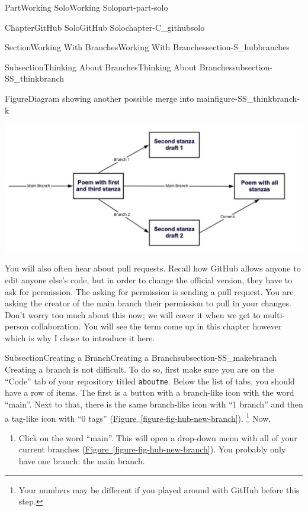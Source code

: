 \documentclass[oneside,10pt,]{book}
\newcommand{\xreffont}{\relax}
\newcommand{\mono}[1]{\texttt{#1}}
\begin{document}
\begin{partptx}{Part}{Working Solo}{}{Working Solo}{}{}{part-part-solo}
\begin{chapterptx}{Chapter}{GitHub Solo}{}{GitHub Solo}{}{}{chapter-C_githubsolo}
\begin{sectionptx}{Section}{Working With Branches}{}{Working With Branches}{}{}{section-S_hubbranches}
\begin{subsectionptx}{Subsection}{Thinking About Branches}{}{Thinking About Branches}{}{}{subsection-SS_thinkbranch}
\begin{figureptx}{Figure}{Diagram showing another possible merge into main}{figure-SS_thinkbranch-k}{}
\begin{image}{0.05}{0.9}{0.05}{}
\includegraphics[width=\linewidth]{external/merge_poem2.pdf}
\end{image}%
\tcblower
\end{figureptx}%
You will also often hear about pull requests. Recall how GitHub allows anyone to edit anyone else's code, but in order to change the official version, they have to ask for permission. The asking for permission is sending a pull request. You are asking the creator of the main branch their permission to pull in your changes. Don't worry too much about this now; we will cover it when we get to multi-person collaboration. You will see the term come up in this chapter however which is why I chose to introduce it here.%
\end{subsectionptx}
%
%
\typeout{************************************************}
\typeout{************************************************}
%
\begin{subsectionptx}{Subsection}{Creating a Branch}{}{Creating a Branch}{}{}{subsection-SS_makebranch}
%
%
Creating a branch is not difficult. To do so, first make sure you are on the ``Code'' tab of your repository titled \mono{aboutme}. Below the list of tabs, you should have a row of items. The first is a button with a branch-like icon with the word ``main''. Next to that, there is the same branch-like icon with ``1 branch'' and then a tag-like icon with ``0 tags'' (\hyperref[figure-fig-hub-new-branch]{Figure~{\xreffont\ref{figure-fig-hub-new-branch}}}). \footnote{Your numbers may be different if you played around with GitHub before this step.\label{fn-SS_makebranch-d-g}} Now,%
\begin{enumerate}
\item{}Click on the word ``main''. This will open a drop-down menu with all of your current branches (\hyperref[figure-fig-hub-new-branch]{Figure~{\xreffont\ref{figure-fig-hub-new-branch}}}). You probably only have one branch: the main branch.%

\end{enumerate}
\end{subsectionptx}
\end{sectionptx}
\end{chapterptx}
\end{partptx}
\end{document}
